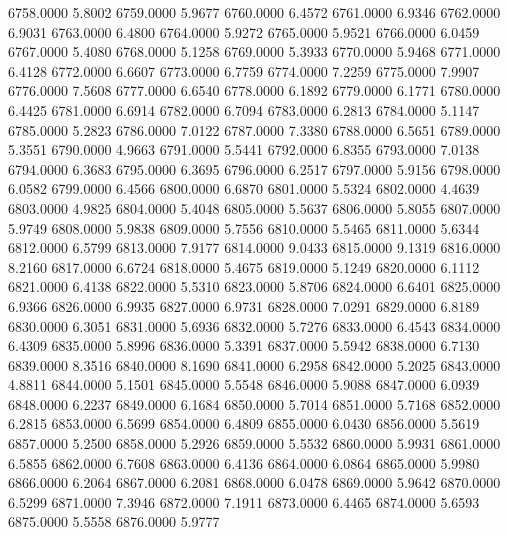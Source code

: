 6758.0000      5.8002
6759.0000      5.9677
6760.0000      6.4572
6761.0000      6.9346
6762.0000      6.9031
6763.0000      6.4800
6764.0000      5.9272
6765.0000      5.9521
6766.0000      6.0459
6767.0000      5.4080
6768.0000      5.1258
6769.0000      5.3933
6770.0000      5.9468
6771.0000      6.4128
6772.0000      6.6607
6773.0000      6.7759
6774.0000      7.2259
6775.0000      7.9907
6776.0000      7.5608
6777.0000      6.6540
6778.0000      6.1892
6779.0000      6.1771
6780.0000      6.4425
6781.0000      6.6914
6782.0000      6.7094
6783.0000      6.2813
6784.0000      5.1147
6785.0000      5.2823
6786.0000      7.0122
6787.0000      7.3380
6788.0000      6.5651
6789.0000      5.3551
6790.0000      4.9663
6791.0000      5.5441
6792.0000      6.8355
6793.0000      7.0138
6794.0000      6.3683
6795.0000      6.3695
6796.0000      6.2517
6797.0000      5.9156
6798.0000      6.0582
6799.0000      6.4566
6800.0000      6.6870
6801.0000      5.5324
6802.0000      4.4639
6803.0000      4.9825
6804.0000      5.4048
6805.0000      5.5637
6806.0000      5.8055
6807.0000      5.9749
6808.0000      5.9838
6809.0000      5.7556
6810.0000      5.5465
6811.0000      5.6344
6812.0000      6.5799
6813.0000      7.9177
6814.0000      9.0433
6815.0000      9.1319
6816.0000      8.2160
6817.0000      6.6724
6818.0000      5.4675
6819.0000      5.1249
6820.0000      6.1112
6821.0000      6.4138
6822.0000      5.5310
6823.0000      5.8706
6824.0000      6.6401
6825.0000      6.9366
6826.0000      6.9935
6827.0000      6.9731
6828.0000      7.0291
6829.0000      6.8189
6830.0000      6.3051
6831.0000      5.6936
6832.0000      5.7276
6833.0000      6.4543
6834.0000      6.4309
6835.0000      5.8996
6836.0000      5.3391
6837.0000      5.5942
6838.0000      6.7130
6839.0000      8.3516
6840.0000      8.1690
6841.0000      6.2958
6842.0000      5.2025
6843.0000      4.8811
6844.0000      5.1501
6845.0000      5.5548
6846.0000      5.9088
6847.0000      6.0939
6848.0000      6.2237
6849.0000      6.1684
6850.0000      5.7014
6851.0000      5.7168
6852.0000      6.2815
6853.0000      6.5699
6854.0000      6.4809
6855.0000      6.0430
6856.0000      5.5619
6857.0000      5.2500
6858.0000      5.2926
6859.0000      5.5532
6860.0000      5.9931
6861.0000      6.5855
6862.0000      6.7608
6863.0000      6.4136
6864.0000      6.0864
6865.0000      5.9980
6866.0000      6.2064
6867.0000      6.2081
6868.0000      6.0478
6869.0000      5.9642
6870.0000      6.5299
6871.0000      7.3946
6872.0000      7.1911
6873.0000      6.4465
6874.0000      5.6593
6875.0000      5.5558
6876.0000      5.9777
